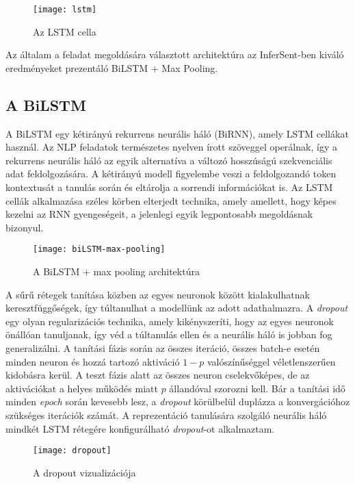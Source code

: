 \begin{figure}[H]
	\centering
	\texttt{[image: lstm]}
	\caption{Az LSTM cella \cite{rnn}}
\end{figure}

Az általam a feladat megoldására választott architektúra az InferSent-ben kiváló eredményeket prezentáló BiLSTM + Max Pooling.

\subsection{A BiLSTM}
A BiLSTM egy kétirányú rekurrens neurális háló (BiRNN), amely LSTM cellákat használ. Az NLP feladatok természetes nyelven írott szöveggel operálnak, így a rekurrens neurális háló az egyik alternatíva a változó hosszúságú szekvenciális adat feldolgozására. A kétirányú modell figyelembe veszi a feldolgozandó token kontextusát a tanulás során és eltárolja a sorrendi információkat is. Az LSTM cellák alkalmazása széles körben elterjedt technika, amely amellett, hogy képes kezelni az RNN gyengeségeit, a jelenlegi egyik legpontosabb megoldásnak bizonyul.

\begin{figure}[H]
	\centering
	\texttt{[image: biLSTM-max-pooling]}
	\caption{A BiLSTM + max pooling architektúra}
\end{figure}

A sűrű rétegek tanítása közben az egyes neuronok között kialakulhatnak keresztfüggőségek, így túltanulhat a modellünk az adott adathalmazra. A \textit{dropout} egy olyan regularizációs technika, amely kikényszeríti, hogy az egyes neuronok önállóan tanuljanak, így véd a túltanulás ellen és a neurális háló is jobban fog generalizálni. A tanítási fázis során az összes iteráció, összes batch-e esetén minden neuron és hozzá tartozó aktiváció $1-p$ valószínűséggel véletlenszerűen kidobásra kerül. A teszt fázis alatt az összes neuron cselekvőképes, de az aktivációkat a helyes működés miatt $p$ állandóval szorozni kell. Bár a tanítási idő minden \textit{epoch} során kevesebb lesz, a \textit{dropout} körülbelül duplázza a konvergációhoz szükséges iterációk számát. A reprezentáció tanulására szolgáló neurális háló mindkét LSTM rétegére konfigurálható \textit{dropout}-ot alkalmaztam.

\begin{figure}[H]
	\centering
	\texttt{[image: dropout]}
	\caption{A dropout vizualizációja \cite{dropout}}
\end{figure}

